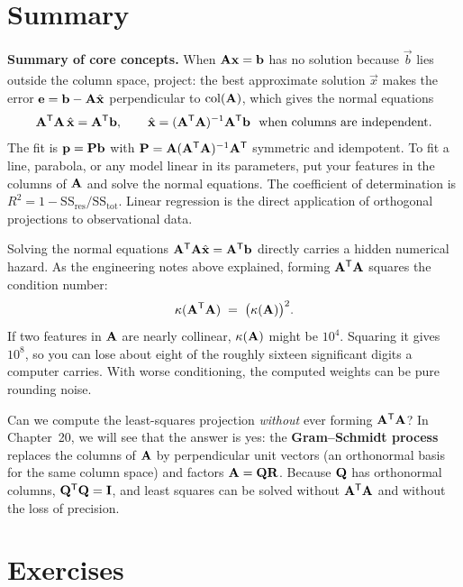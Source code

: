 \section{Summary}

\begin{focusbox}
\textbf{Summary of core concepts.} When $\mathbf{A}\mathbf{x}=\mathbf{b}$ has no solution because
$\vec{b}$ lies outside the column space, project: the best approximate solution $\hat{\vec{x}}$
makes the error $\mathbf{e}=\mathbf{b}-\mathbf{A}\hat{\mathbf{x}}$ perpendicular to $\operatorname{col}(\mathbf{A})$,
which gives the normal equations
\[
  \mathbf{A}^{\mathsf{T}}\mathbf{A}\,\hat{\mathbf{x}}=\mathbf{A}^{\mathsf{T}}\mathbf{b},
  \qquad
  \hat{\mathbf{x}}=(\mathbf{A}^{\mathsf{T}}\mathbf{A})^{-1}\mathbf{A}^{\mathsf{T}}\mathbf{b}
  \ \text{ when columns are independent.}
\]
The fit is $\mathbf{p}=\mathbf{P}\mathbf{b}$ with $\mathbf{P}=\mathbf{A}(\mathbf{A}^{\mathsf{T}}\mathbf{A})^{-1}\mathbf{A}^{\mathsf{T}}$
symmetric and idempotent. To fit a line, parabola, or any model linear in its parameters, put your
features in the columns of $\mathbf{A}$ and solve the normal equations. The coefficient of determination
is $R^2=1-\mathrm{SS_{res}}/\mathrm{SS_{tot}}$. Linear regression is the direct application of
orthogonal projections to observational data.
\end{focusbox}

\begin{connectionbox}
Solving the normal equations $\mathbf{A}^{\mathsf{T}}\mathbf{A}\hat{\mathbf{x}}=\mathbf{A}^{\mathsf{T}}\mathbf{b}$ directly carries
a hidden numerical hazard. As the engineering notes above explained, forming $\mathbf{A}^{\mathsf{T}}\mathbf{A}$
squares the condition number:
\[
  \kappa(\mathbf{A}^{\mathsf{T}}\mathbf{A}) \;=\; \bigl(\kappa(\mathbf{A})\bigr)^2.
\]
If two features in $\mathbf{A}$ are nearly collinear, $\kappa(\mathbf{A})$ might be $10^4$. Squaring it
gives $10^8$, so you can lose about eight of the roughly sixteen significant digits a computer
carries. With worse conditioning, the computed weights can be pure rounding noise.

Can we compute the least-squares projection \emph{without} ever forming $\mathbf{A}^{\mathsf{T}}\mathbf{A}$? In
Chapter~20, we will see that the answer is yes: the \textbf{Gram--Schmidt process} replaces the
columns of $\mathbf{A}$ by perpendicular unit vectors (an orthonormal basis for the same column space)
and factors $\mathbf{A} = \mathbf{Q}\mathbf{R}$. Because $\mathbf{Q}$ has orthonormal columns,
$\mathbf{Q}^{\mathsf{T}}\mathbf{Q} = \mathbf{I}$, and least squares can be solved without $\mathbf{A}^{\mathsf{T}}\mathbf{A}$ and
without the loss of precision.
\end{connectionbox}

\section*{Exercises}

